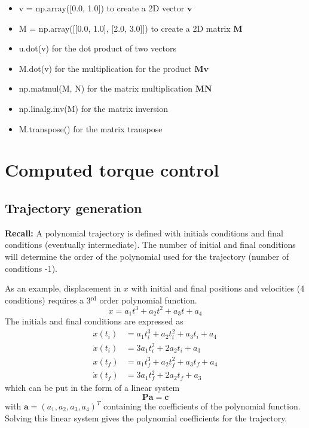 \documentclass[a4paper]{article}
\begin{document}
\begin{itemize}
    \item v = np.array([0.0, 1.0]) to create a 2D vector $\mathbf{v}$
    \item M = np.array([[0.0, 1.0], [2.0, 3.0]]) to create a 2D matrix $\mathbf{M}$
    \item u.dot(v) for the dot product of two vectors
    \item M.dot(v) for the multiplication for the product $\mathbf{M}\mathbf{v}$
    \item np.matmul(M, N) for the matrix multiplication $\mathbf{M}\mathbf{N}$
    \item np.linalg.inv(M) for the matrix inversion
    \item M.transpose() for the matrix transpose
\end{itemize}
%
\section{Computed torque control}
%
\subsection{Trajectory generation}
%
\textbf{Recall:} A polynomial trajectory is defined with initials conditions and final conditions (eventually intermediate). The number of initial and final conditions will determine the order of the polynomial used for the trajectory (number of conditions -1). 

As an example, displacement in $x$ with initial and final positions and velocities (4 conditions) requires a 3$^{\text{rd}}$ order polynomial function.
%
\begin{equation}
x=a_1t^3+a_2t^2+a_3t+a_4\nonumber
\end{equation}
%
The initials and final conditions are expressed as
\begin{align*}
x(t_i)&=a_1t_i^3+a_2t_i^2+a_3t_i+a_4\\
\dot{x}(t_i)&=3a_1t_i^2+2a_2t_i+a_3\\
x(t_f)&=a_1t_f^3+a_2t_f^2+a_3t_f+a_4\\
\dot{x}(t_f)&=3a_1t_f^2+2a_2t_f+a_3
\end{align*}
which can be put in the form of a linear system
%
\begin{equation}
\mathbf{P}\mathbf{a}=\mathbf{c}\nonumber
\end{equation}
%
with $\mathbf{a}=(a_1,a_2,a_3,a_4)^T$ containing the coefficients of the polynomial function. Solving this linear system gives the polynomial coefficients for the trajectory.
\end{document}

